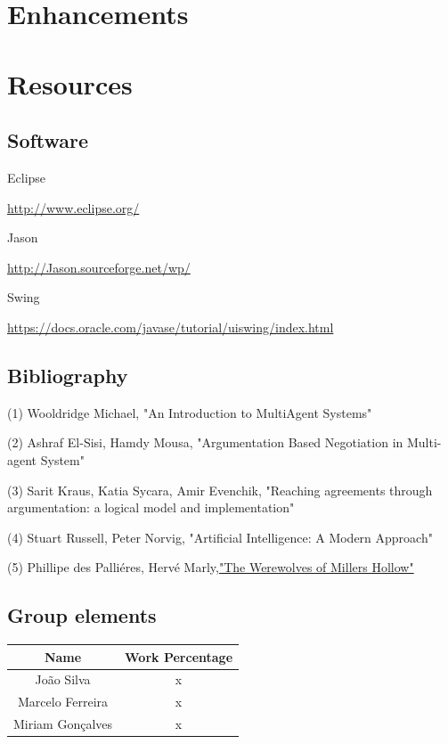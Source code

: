 \documentclass{article}
\begin{document}
\section{Enhancements}


\section{Resources}

\subsection{Software}
Eclipse \par
\url{http://www.eclipse.org/} \par
\vspace{3mm}
Jason \par
\url{http://Jason.sourceforge.net/wp/} \par 
\vspace{3mm}
Swing \par
\url{https://docs.oracle.com/javase/tutorial/uiswing/index.html} \par
\subsection{Bibliography}
\noindent
(1) Wooldridge Michael, "An Introduction to MultiAgent Systems"

\noindent
(2) Ashraf El-Sisi, Hamdy Mousa, "Argumentation Based Negotiation in Multi-agent System"

\noindent
(3) Sarit Kraus, Katia Sycara, Amir Evenchik, "Reaching agreements through argumentation: a logical model and implementation"

\noindent
(4) Stuart Russell, Peter Norvig, "Artificial Intelligence: A Modern Approach"

\noindent
(5) Phillipe des Palliéres, Hervé Marly,\href{https://images-cdn.asmodee.us/filer_public/16/d8/16d81cd1-7f49-4f2e-a95d-fc408bcef79a/kg01_rules.pdf}{"The Werewolves of Millers Hollow"}

\subsection{Group elements}
\begin{center}
\begin{tabular}{ |c|c| }
\hline
 \textbf{Name} & \textbf{Work Percentage} \\  
 \hline
 João Silva & x \\ 
 \hline
 Marcelo Ferreira & x \\ 
 \hline
 Miriam Gonçalves & x \\ 
 \hline
\end{tabular}
\end{center}
\end{document}
